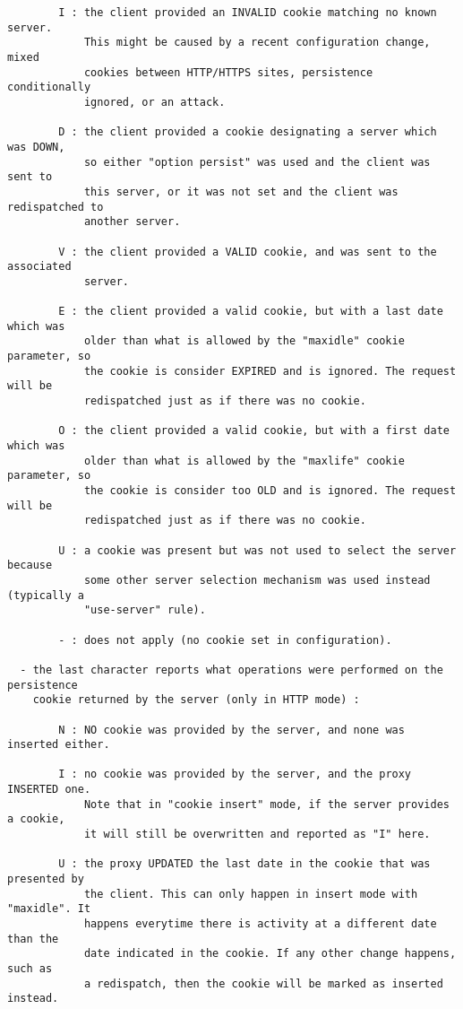 \begin{verbatim}
        I : the client provided an INVALID cookie matching no known server.
            This might be caused by a recent configuration change, mixed
            cookies between HTTP/HTTPS sites, persistence conditionally
            ignored, or an attack.

        D : the client provided a cookie designating a server which was DOWN,
            so either "option persist" was used and the client was sent to
            this server, or it was not set and the client was redispatched to
            another server.

        V : the client provided a VALID cookie, and was sent to the associated
            server.

        E : the client provided a valid cookie, but with a last date which was
            older than what is allowed by the "maxidle" cookie parameter, so
            the cookie is consider EXPIRED and is ignored. The request will be
            redispatched just as if there was no cookie.

        O : the client provided a valid cookie, but with a first date which was
            older than what is allowed by the "maxlife" cookie parameter, so
            the cookie is consider too OLD and is ignored. The request will be
            redispatched just as if there was no cookie.

        U : a cookie was present but was not used to select the server because
            some other server selection mechanism was used instead (typically a
            "use-server" rule).

        - : does not apply (no cookie set in configuration).

  - the last character reports what operations were performed on the persistence
    cookie returned by the server (only in HTTP mode) :

        N : NO cookie was provided by the server, and none was inserted either.

        I : no cookie was provided by the server, and the proxy INSERTED one.
            Note that in "cookie insert" mode, if the server provides a cookie,
            it will still be overwritten and reported as "I" here.

        U : the proxy UPDATED the last date in the cookie that was presented by
            the client. This can only happen in insert mode with "maxidle". It
            happens everytime there is activity at a different date than the
            date indicated in the cookie. If any other change happens, such as
            a redispatch, then the cookie will be marked as inserted instead.


\end{verbatim}
